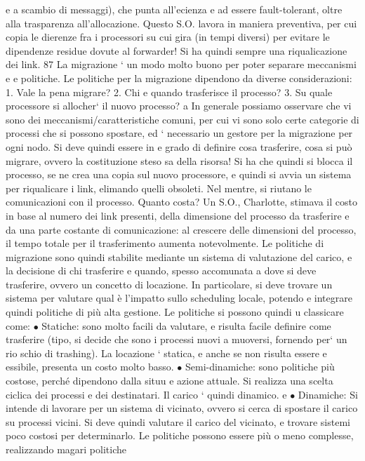 \documentclass[a4paper,12pt]{article}
\begin{document}
e
a scambio di messaggi), che punta all'ecienza e ad essere fault-tolerant, oltre
alla trasparenza all'allocazione. Questo S.O. lavora in maniera preventiva, per
cui copia le dierenze fra i processori su cui gira (in tempi diversi) per evitare
le dipendenze residue dovute al forwarder! Si ha quindi sempre una riqualicazione dei link.
87
La migrazione ` un modo molto buono per poter separare meccanismi e
e
politiche. Le politiche per la migrazione dipendono da diverse considerazioni:
1. Vale la pena migrare?
2. Chi e quando trasferisce il processo?
3. Su quale processore si allocher` il nuovo processo?
a
In generale possiamo osservare che vi sono dei meccanismi/caratteristiche comuni, per cui vi sono solo certe categorie
di processi che si possono spostare, ed
` necessario un gestore per la migrazione per ogni nodo. Si deve quindi essere in
e
grado di definire cosa trasferire, cosa si può migrare, ovvero la costituzione steso
sa della risorsa! Si ha che quindi si blocca il processo, se ne crea una copia sul
nuovo processore, e quindi si avvia un sistema per riqualicare i link, elimando
quelli obsoleti. Nel mentre, si riutano le comunicazioni con il processo.
Quanto costa? Un S.O., Charlotte, stimava il costo in base al numero dei
link presenti, della dimensione del processo da trasferire e da una parte costante
di comunicazione: al crescere delle dimensioni del processo, il tempo totale per
il trasferimento aumenta notevolmente.
Le politiche di migrazione sono quindi stabilite mediante un sistema di valutazione del carico, e la decisione di chi
trasferire e quando, spesso accomunata
a dove si deve trasferire, ovvero un concetto di locazione. In particolare, si deve
trovare un sistema per valutare qual è l'impatto sullo scheduling locale, potendo
e
integrare quindi politiche di più alta gestione. Le politiche si possono quindi
u
classicare come:
$\bullet$ Statiche: sono molto facili da valutare, e risulta facile definire come trasferire
(tipo, si decide che sono i processi nuovi a muoversi, fornendo per` un rio
schio di trashing). La locazione ` statica, e anche se non risulta essere
e
essibile, presenta un costo molto basso.
$\bullet$ Semi-dinamiche: sono politiche più costose, perché dipendono dalla situu
e
azione attuale. Si realizza una scelta ciclica dei processi e dei destinatari.
Il carico ` quindi dinamico.
e
$\bullet$ Dinamiche: Si intende di lavorare per un sistema di vicinato, ovvero si
cerca di spostare il carico su processi vicini. Si deve quindi valutare il
carico del vicinato, e trovare sistemi poco costosi per determinarlo.
Le politiche possono essere più o meno complesse, realizzando magari politiche
\end{document}
